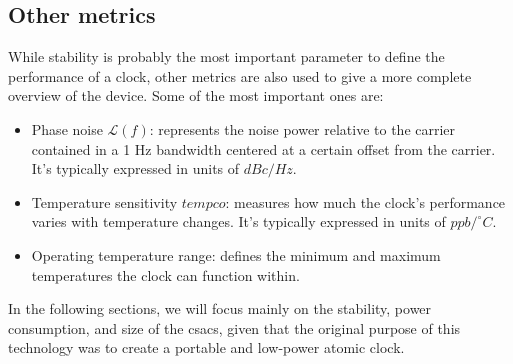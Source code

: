 \subsection{Other metrics}
\label{subsec:other_metrics}

While stability is probably the most important parameter to define the performance of a clock, other metrics are also used to give a more complete overview of the device.
Some of the most important ones are:

\begin{itemize}
  \item Phase noise $\mathcal{L}(f)$: represents the noise power relative to the carrier contained in a 1 Hz bandwidth centered at a certain offset from the carrier. It's typically expressed in units of $dBc/Hz$.
  \item Temperature sensitivity $tempco$: measures how much the clock's performance varies with temperature changes. It's typically expressed in units of $ppb/^\circ C$.
  \item Operating temperature range: defines the minimum and maximum temperatures the clock can function within.
\end{itemize}

In the following sections, we will focus mainly on the stability, power consumption, and size of the \acrshort{csacs}, given that the original purpose of this technology was to create a portable and low-power atomic clock.

